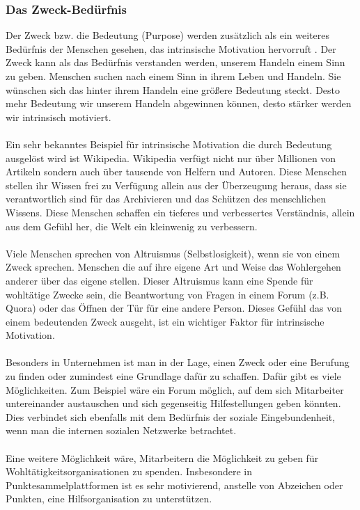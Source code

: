 \documentclass[a4paper,12pt,twoside]{scrartcl}
\begin{document}
\subsubsection{Das Zweck-Bedürfnis}
Der Zweck bzw. die Bedeutung (Purpose) werden zusätzlich als ein weiteres Bedürfnis der Menschen gesehen, das intrinsische Motivation hervorruft \cite{Pink2010}. Der Zweck kann als das Bedürfnis verstanden werden, unserem Handeln einem Sinn zu geben. Menschen suchen nach einem Sinn in ihrem Leben und Handeln. Sie wünschen sich das hinter ihrem Handeln eine größere Bedeutung steckt. Desto mehr Bedeutung wir unserem Handeln abgewinnen können, desto stärker werden wir intrinsisch motiviert. 
\\\\
Ein sehr bekanntes Beispiel für intrinsische Motivation die durch Bedeutung ausgelöst wird ist Wikipedia. Wikipedia verfügt nicht nur über Millionen von Artikeln sondern auch über tausende von Helfern und Autoren. Diese Menschen stellen ihr Wissen frei zu Verfügung allein aus der Überzeugung heraus, dass sie verantwortlich sind für das Archivieren und das Schützen des menschlichen Wissens. Diese Menschen schaffen ein tieferes und verbessertes Verständnis, allein aus dem Gefühl her, die Welt ein kleinwenig zu verbessern.
\\\\
Viele Menschen sprechen von Altruismus (Selbstlosigkeit), wenn sie von einem Zweck sprechen. Menschen die auf ihre eigene Art und Weise das Wohlergehen anderer über das eigene stellen. Dieser Altruismus kann eine Spende für wohltätige Zwecke sein, die Beantwortung von Fragen in einem Forum (z.B. Quora) oder das Öffnen der Tür für eine andere Person. Dieses Gefühl das von einem bedeutenden Zweck ausgeht, ist ein wichtiger Faktor für intrinsische Motivation.
\\\\
Besonders in Unternehmen ist man in der Lage, einen Zweck oder eine Berufung zu finden oder zumindest eine Grundlage dafür zu schaffen. Dafür gibt es viele Möglichkeiten. Zum Beispiel wäre ein Forum möglich, auf dem sich Mitarbeiter untereinander austauschen und sich gegenseitig Hilfestellungen geben könnten. Dies verbindet sich ebenfalls mit dem Bedürfnis der soziale Eingebundenheit, wenn man die internen sozialen Netzwerke betrachtet.
\\\\ 
Eine weitere Möglichkeit wäre, Mitarbeitern die Möglichkeit zu geben für Wohltätigkeitsorganisationen zu spenden. Insbesondere in Punktesammelplattformen ist es sehr motivierend, anstelle von Abzeichen oder Punkten, eine Hilfsorganisation zu unterstützen.
\end{document}
